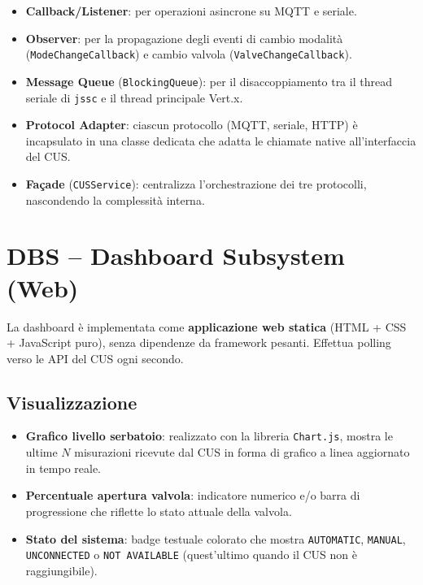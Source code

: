 \documentclass[12pt, a4paper]{article}
\begin{document}
\begin{itemize}
    \item \textbf{Callback/Listener}: per operazioni asincrone su MQTT e seriale.
    \item \textbf{Observer}: per la propagazione degli eventi di cambio modalità (\texttt{ModeChangeCallback}) e cambio valvola (\texttt{ValveChangeCallback}).
    \item \textbf{Message Queue} (\texttt{BlockingQueue}): per il disaccoppiamento tra il thread seriale di \texttt{jssc} e il thread principale Vert.x.
    \item \textbf{Protocol Adapter}: ciascun protocollo (MQTT, seriale, HTTP) è incapsulato in una classe dedicata che adatta le chiamate native all'interfaccia del CUS.
    \item \textbf{Façade} (\texttt{CUSService}): centralizza l'orchestrazione dei tre protocolli, nascondendo la complessità interna.
\end{itemize}

\section{DBS -- Dashboard Subsystem (Web)}

La dashboard è implementata come \textbf{applicazione web statica} (HTML + CSS + JavaScript puro), senza dipendenze da framework pesanti. Effettua polling verso le API del CUS ogni secondo.

\subsection{Visualizzazione}

\begin{itemize}
    \item \textbf{Grafico livello serbatoio}: realizzato con la libreria \texttt{Chart.js}, mostra le ultime $N$ misurazioni ricevute dal CUS in forma di grafico a linea aggiornato in tempo reale.
    \item \textbf{Percentuale apertura valvola}: indicatore numerico e/o barra di progressione che riflette lo stato attuale della valvola.
    \item \textbf{Stato del sistema}: badge testuale colorato che mostra \texttt{AUTOMATIC}, \texttt{MANUAL}, \texttt{UNCONNECTED} o \texttt{NOT AVAILABLE} (quest'ultimo quando il CUS non è raggiungibile).
\end{itemize}
\end{document}
